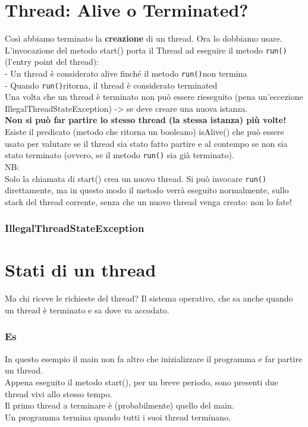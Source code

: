 \section{Thread: Alive o Terminated?}
Così abbiamo terminato la \textbf{creazione} di un thread. Ora lo dobbiamo usare.
L'invocazione del metodo start() porta il Thread ad eseguire il metodo \verb#run()# (l'entry point del thread):
\\- Un thread è considerato alive finché il metodo \verb#run()#non termina
\\- Quando \verb#run()#ritorna, il thread è considerato terminated
\\Una volta che un thread è terminato non può essere rieseguito (pena un'eccezione IllegalThreadStateException) -> se deve creare una nuova istanza.
\\\textbf{Non si può far partire lo stesso thread (la stessa istanza) più volte!}
\\Esiste il predicato (metodo che ritorna un booleano) isAlive() che può essere usato per valutare se il thread sia stato fatto partire e al contempo se non sia stato terminato (ovvero, se il metodo \verb#run()# sia già terminato).
\\NB:
\\Solo la chiamata di start() crea un nuovo thread. Si può invocare \verb#run()# direttamente, ma in questo modo il metodo verrà eseguito normalmente, sullo stack del thread corrente, senza che un nuovo thread venga creato: non lo fate!

\subsubsection{IllegalThreadStateException}

\section{Stati di un thread}
Ma chi riceve le richieste del thread? Il sistema operativo, che sa anche quando un thread è terminato e sa dove va accodato.

\subsubsection{Es}
In questo esempio il main non fa altro che inizializzare il programma e far partire un thread.
\\Appena eseguito il metodo start(), per un breve periodo, sono presenti due thread vivi allo stesso tempo.
\\Il primo thread a terminare è (probabilmente) quello del main.
\\Un programma termina quando tutti i suoi thread terminano.

